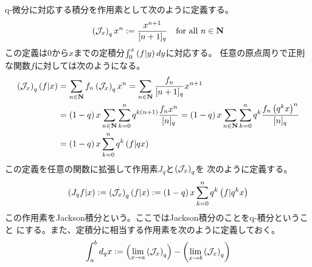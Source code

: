 {	q-微分に対応する積分を作用素として次のように定義する。
	\begin{equation*}\begin{split}
		\plr{\J_x}_q x^n := \frac{x^{n+1}}{[n+1]_q} \quad\text{for all } n\in\sizen
	\end{split}\end{equation*}
	この定義は$0$から$x$までの定積分$\int_0^x\plr{f|y}dy$に対応する。
	任意の原点周りで正則な関数$f$に対しては次のようになる。
	\begin{equation*}\begin{split}
		\plr{\J_x}_q \plr{f|x} &= \sum_{n\in\sizen} f_n \plr{\J_x}_q x^n
		= \sum_{n\in\sizen} \frac{f_n}{[n+1]_q} x^{n+1} \\
		&= \plr{1 - q}x \sum_{n\in\sizen}\sum_{k=0}^n q^{k\plr{n+1}}
			\frac{f_nx^n}{[n]_q}
		= \plr{1 - q}x \sum_{n\in\sizen}\sum_{k=0}^n q^k\frac{f_n\plr{q^kx}^n}{[n]_q} \\
		&= \plr{1 - q}x \sum_{k=0}^n q^k\plr{f|qx}
	\end{split}\end{equation*}
	この定義を任意の関数に拡張して作用素$J_q$と$\plr{\J_x}_q$を
	次のように定義する。
	\begin{equation*}\begin{split}
		\plr{J_qf|x} := \plr{\J_x}_q \plr{f|x} 
		:= \plr{1 - q}x \sum_{k=0}^n q^k\plr{f|q^kx}
	\end{split}\end{equation*}
	この作用素をJackson積分という。ここではJackson積分のことをq-積分ということ
	にする。また、定積分に相当する作用素を次のように定義しておく。
	\begin{equation*}\begin{split}
		\int_a^bd_qx := \plr{\lim_{x\to a}\plr{\J_x}_q}
			- \plr{\lim_{x\to b}\plr{\J_x}_q}
	\end{split}\end{equation*}

}
